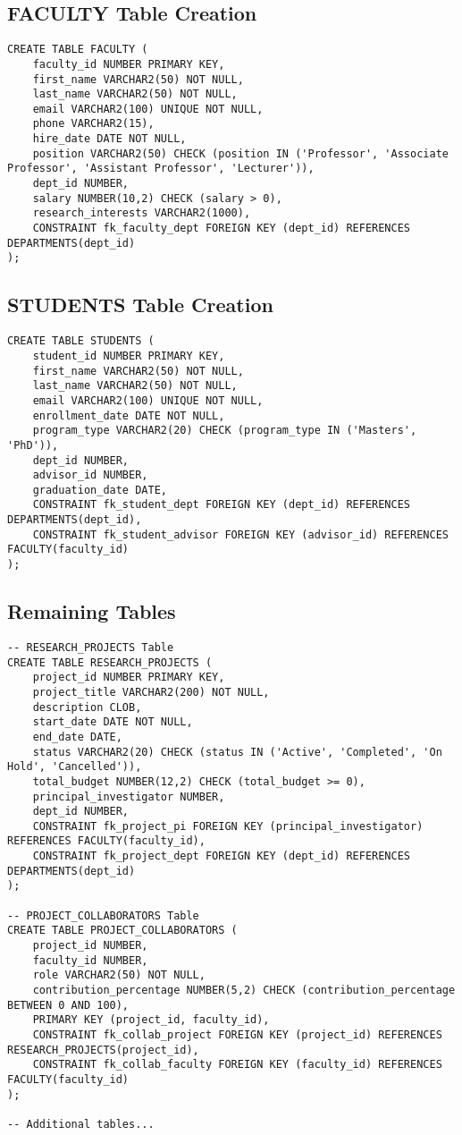 \documentclass[12pt,a4paper]{article}
\begin{document}
\subsection{FACULTY Table Creation}
\begin{lstlisting}[style=sqlstyle]
CREATE TABLE FACULTY (
    faculty_id NUMBER PRIMARY KEY,
    first_name VARCHAR2(50) NOT NULL,
    last_name VARCHAR2(50) NOT NULL,
    email VARCHAR2(100) UNIQUE NOT NULL,
    phone VARCHAR2(15),
    hire_date DATE NOT NULL,
    position VARCHAR2(50) CHECK (position IN ('Professor', 'Associate Professor', 'Assistant Professor', 'Lecturer')),
    dept_id NUMBER,
    salary NUMBER(10,2) CHECK (salary > 0),
    research_interests VARCHAR2(1000),
    CONSTRAINT fk_faculty_dept FOREIGN KEY (dept_id) REFERENCES DEPARTMENTS(dept_id)
);
\end{lstlisting}

\subsection{STUDENTS Table Creation}
\begin{lstlisting}[style=sqlstyle]
CREATE TABLE STUDENTS (
    student_id NUMBER PRIMARY KEY,
    first_name VARCHAR2(50) NOT NULL,
    last_name VARCHAR2(50) NOT NULL,
    email VARCHAR2(100) UNIQUE NOT NULL,
    enrollment_date DATE NOT NULL,
    program_type VARCHAR2(20) CHECK (program_type IN ('Masters', 'PhD')),
    dept_id NUMBER,
    advisor_id NUMBER,
    graduation_date DATE,
    CONSTRAINT fk_student_dept FOREIGN KEY (dept_id) REFERENCES DEPARTMENTS(dept_id),
    CONSTRAINT fk_student_advisor FOREIGN KEY (advisor_id) REFERENCES FACULTY(faculty_id)
);
\end{lstlisting}

\subsection{Remaining Tables}
\begin{lstlisting}[style=sqlstyle]
-- RESEARCH_PROJECTS Table
CREATE TABLE RESEARCH_PROJECTS (
    project_id NUMBER PRIMARY KEY,
    project_title VARCHAR2(200) NOT NULL,
    description CLOB,
    start_date DATE NOT NULL,
    end_date DATE,
    status VARCHAR2(20) CHECK (status IN ('Active', 'Completed', 'On Hold', 'Cancelled')),
    total_budget NUMBER(12,2) CHECK (total_budget >= 0),
    principal_investigator NUMBER,
    dept_id NUMBER,
    CONSTRAINT fk_project_pi FOREIGN KEY (principal_investigator) REFERENCES FACULTY(faculty_id),
    CONSTRAINT fk_project_dept FOREIGN KEY (dept_id) REFERENCES DEPARTMENTS(dept_id)
);

-- PROJECT_COLLABORATORS Table
CREATE TABLE PROJECT_COLLABORATORS (
    project_id NUMBER,
    faculty_id NUMBER,
    role VARCHAR2(50) NOT NULL,
    contribution_percentage NUMBER(5,2) CHECK (contribution_percentage BETWEEN 0 AND 100),
    PRIMARY KEY (project_id, faculty_id),
    CONSTRAINT fk_collab_project FOREIGN KEY (project_id) REFERENCES RESEARCH_PROJECTS(project_id),
    CONSTRAINT fk_collab_faculty FOREIGN KEY (faculty_id) REFERENCES FACULTY(faculty_id)
);

-- Additional tables...
\end{lstlisting}
\end{document}

